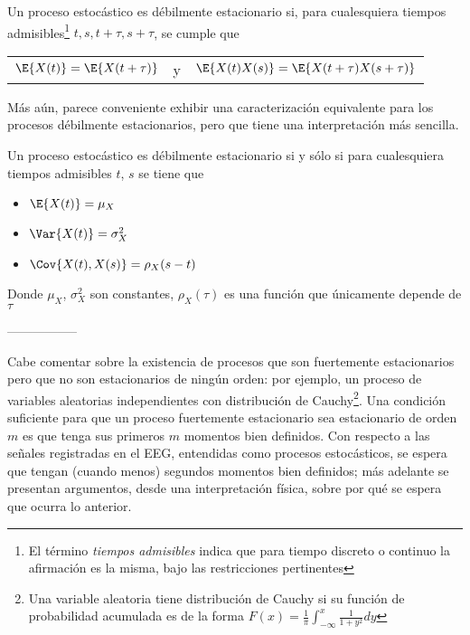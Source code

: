 \begin{defn}
Un proceso estoc\'astico \xt es d\'ebilmente estacionario si, para cualesquiera tiempos 
admisibles\footnote{El t\'ermino \textit{tiempos admisibles} indica que para tiempo 
discreto o continuo la afirmaci\'on es la misma, bajo las restricciones pertinentes} 
$t, s, t+\tau, s+\tau$, se cumple que
\begin{center}
\begin{tabular}{ccc}
$\E{X(t)} = \E{X(t+\tau)}$
& y &
$\E{X(t)X(s)} = \E{X(t+\tau)X(s+\tau)}$
\end{tabular}
\end{center}
\label{est_orden_2}
\end{defn}

M\'as a\'un, parece conveniente exhibir una caracterizaci\'on equivalente para los procesos 
d\'ebilmente estacionarios, pero que tiene una interpretaci\'on m\'as sencilla.
\begin{thrm}
Un proceso estoc\'astico es d\'ebilmente estacionario si y s\'olo si para cualesquiera tiempos 
admisibles $t$, $s$ se tiene que
\begin{itemize}
\item $\E{X(t)} = \mu_X$
\item $\Var{X(t)} = \sigma^{2}_X$
\item $\Cov{X(t),X(s)} = \rho_X (s-t)$
\end{itemize}
Donde $\mu_X$, $\sigma^{2}_X$ son constantes, $\rho_X(\tau)$ es una funci\'on que \'unicamente 
depende de $\tau$
\label{est_usual}
\end{thrm}

-----------------

Cabe comentar  sobre la existencia de procesos que son fuertemente estacionarios pero que no son 
estacionarios de ning\'un orden: por ejemplo, un proceso de variables aleatorias independientes con 
distribuci\'on de Cauchy\footnote{Una variable aleatoria tiene distribuci\'on de Cauchy si su 
funci\'on de probabilidad acumulada es de la forma 
$\displaystyle F(x) = \frac{1}{\pi} \int_{-\infty}^{x} \frac{1}{1+y^{2}} dy$}.
Una condici\'on suficiente para que un proceso fuertemente estacionario sea estacionario de orden 
$m$ es que tenga sus primeros $m$ momentos bien definidos.
Con respecto a las se\~nales registradas en el EEG, entendidas como procesos estoc\'asticos, se 
espera que tengan (cuando menos) segundos momentos bien definidos; m\'as adelante se presentan 
argumentos, desde una interpretaci\'on f\'isica, sobre por qu\'e se espera que ocurra lo anterior.



